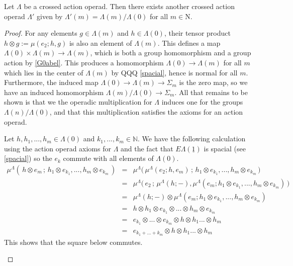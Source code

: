 \documentclass{amsbook} %
\newcommand{\EL}{E\Lambda}
\numberwithin{section}{chapter}
\begin{document}
\begin{prop} \label{G0quot} Let $\Lambda$ be a crossed action operad. Then there exists another crossed action operad $\Lambda'$ given by $\Lambda'(m) = \Lambda(m)/\Lambda(0)$ for all $m \in \mathrm{N}$.
\end{prop}
\begin{proof}
For any elements $g \in \Lambda(m)$ and $h \in \Lambda(0)$, their tensor product $h \otimes g := \mu(e_2; h, g)$ is also an element of $\Lambda(m)$. This defines a map $\Lambda(0) \times \Lambda(m) \to \Lambda(m)$, which is both a group homomorphism and a group action by \cref{G0abel}. This produces a homomorphism $\Lambda(0) \to \Lambda(m)$ for all $m$ which lies in the center of $\Lambda(m)$ by QQQ \cref{spacial}, hence is normal for all $m$. Furthermore, the induced map $\Lambda(0) \to \Lambda(m) \to \Sigma_m$ is the zero map, so we have an induced homomorphism $\Lambda(m)/\Lambda(0) \to \Sigma_m$. All that remains to be shown is that we the operadic multiplication for $\Lambda$ induces one for the groups $\Lambda(n)/\Lambda(0)$, and that this multiplication satisfies the axioms for an action operad.

Let $h, h_1, ..., h_m \in \Lambda(0)$ and $k_1, ..., k_m \in \mathbb{N}$. We have the following calculation using the action operad axioms for $\Lambda$ and the fact that $\EL(\underline{1})$ is spacial (see \cref{spacial}) so the $e_k$ commute with all elements of $\Lambda(0)$.
\[ \begin{array}{rll}
		\mu^{\Lambda}( \, h \otimes e_m \, ; \, h_1 \otimes e_{k_1}, ..., h_m \otimes e_{k_m} \, ) & = & \mu^{\Lambda}\big( \, \mu^{\Lambda}(e_2; h, e_m) \, ; \, h_1 \otimes e_{k_1}, ..., h_m \otimes e_{k_m} \, \big) \\
		& = & \mu^{\Lambda}\big( \, e_2 \, ; \, \mu^{\Lambda}(h;-), \mu^{\Lambda}(e_m; h_1 \otimes e_{k_1}, ..., h_m \otimes e_{k_m}) \, \big) \\
		& = & \mu^{\Lambda}(h;-) \otimes \mu^{\Lambda}(e_m; h_1 \otimes e_{k_1}, ..., h_m \otimes e_{k_m})  \\
		& = & h \otimes h_1 \otimes e_{k_1} \otimes ... \otimes h_m \otimes e_{k_m} \\
		& = & e_{k_1} \otimes ... \otimes e_{k_m} \otimes h \otimes h_1 ... \otimes h_m \\
		& = & e_{k_1+...+k_m} \otimes h \otimes h_1 ... \otimes h_m
		\end{array}
\]
This shows that the square below commutes.
\begin{center}
\end{center}	


\end{proof}
\end{document}
